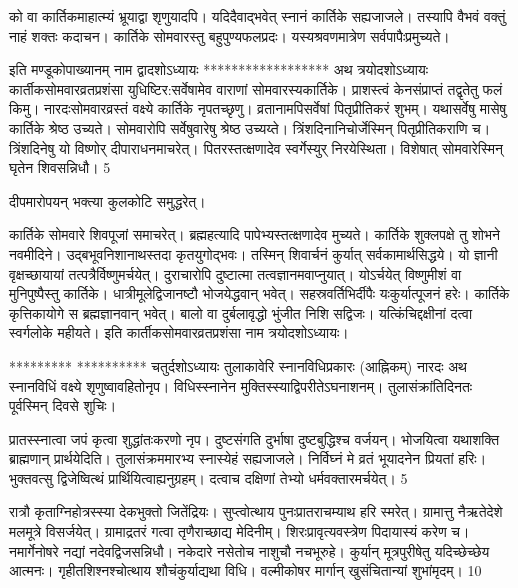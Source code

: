 को वा कार्तिकमाहात्म्यं भ्रूयाद्वा शृणुयादपि।
यदिदैवाद्भवेत् स्नानं कार्तिके सह्यजाजले।
तस्यापि वैभवं वक्तुं नाहं शक्तः कदाचन।
कार्तिके सोमवारस्तु बहुपुण्यफलप्रदः।
यस्यश्रवणमात्रेण सर्वपापैःप्रमुच्यते।

इति मण्डूकोपाख्यानम् नाम द्वादशोऽध्यायः
******************
अथ त्रयोदशोऽध्यायः
कार्तीकसोमवारव्रतप्रशंसा युधिष्टिर:सर्वेषामेव वाराणां सोमवारस्यकार्तिके।
प्राशस्त्वं केनसंप्राप्तं तद्वृतेतु फलं किमु।
नारदःसोमवारव्रस्तं वक्ष्ये कार्तिके नृपतच्छृणु।
व्रतानामपिसर्वेषां पितृप्रीतिकरं शुभम्।
यथासर्वेषु मासेषु कार्तिके श्रेष्ठ उच्यते।
सोमवारोपि सर्वेषुवारेषु श्रेष्ठ उच्यय्ते।
त्रिंशदिनानिचोर्जेस्मिन् पितृप्रीतिकराणि च।
त्रिंशदिनेषु यो विष्णोर् दीपाराधनमाचरेत्।
पितरस्तत्क्षणादेव स्वर्गेस्युर् निरयेस्थिता।
विशेषात् सोमवारेस्मिन् घृतेन शिवसन्निधौ।
5

दीपमारोपयन् भक्त्या कुलकोटि समुद्धरेत्।

कार्तिके सोमवारे शिवपूजां समाचरेत्।
ब्रह्महत्यादि पापेभ्यस्तत्क्षणादेव मुच्यते।
कार्तिके शुक्लपक्षे तु शोभने नवमीदिने।
उद्बभूवनिशानाथस्तदा कृतयुगोद्भवः।
तस्मिन् शिवार्चनं कुर्यात् सर्वकामार्थसिद्धये।
यो ज्ञानी वृक्षच्छायायां तत्पत्रैर्विष्णुमर्चयेत्।
दुराचारोपि दुष्टात्मा तत्वज्ञानमवाप्नुयात्।
योऽर्चयेत् विष्णुमीशं वा मुनिपुष्पैस्तु कार्तिके।
धात्रीमूलेद्विजानष्टौ भोजयेद्धवान् भवेत्।
सहस्रवर्तिभिर्दीपैः यःकुर्यात्पूजनं हरेः।
कार्तिके कृत्तिकायोगे स ब्रह्मज्ञानवान् भवेत्।
बालो वा दुर्बलावृद्धो भुंजीत निशि सद्विजः।
यत्किंचिद्दक्षीनां दत्वा स्वर्गलोके महीयते।
इति कार्तीकसोमवारव्रतप्रशंसा नाम
त्रयोदशोऽध्यायः।

*********
**********
चतुर्दशोऽध्यायः तुलाकावेरि स्नानविधिप्रकारः (आह्निकम्)
नारदः
अथ स्नानविधिं वक्ष्ये शृणुष्वावहितोनृप।
विधिस्स्नानेन मुक्तिस्स्याद्विपरीतेऽघनाशनम्।
तुलासंक्रांतिदिनतः पूर्वस्मिन् दिवसे शुचिः।

प्रातस्स्नात्वा जपं कृत्वा शुद्धांतःकरणो नृप।
दुष्टसंगति दुर्भाषा दुष्टबुद्धिश्च वर्जयन्।
भोजयित्वा यथाशक्ति ब्राह्मणान् प्रार्थयेदिति।
तुलासंक्रममारभ्य स्नास्येहं सह्यजाजले।
निर्विघ्नं मे व्रतं भूयादनेन प्रियतां हरिः।
भुक्तवत्सु द्विजेष्वित्थं प्रार्थियित्वाह्यनुग्रहम्।
दत्वाच दक्षिणां तेभ्यो धर्मवक्तारमर्चयेत्।
5

रात्रौ कृताग्निहोत्रस्स्या देकभुक्तो जितेंद्रियः।
सुप्त्वोत्थाय पुनःप्रातराचम्याथ हरि स्मरेत्।
ग्रामात्तु नैऋतेदेशे मलमूत्रे विसर्जयेत्।
ग्रामाद्रतरं गत्वा तृणैराच्छाद्य मेदिनीम्।
शिरःप्रावृत्यवस्त्रेण पिदायास्यं करेण च।
नमार्गेनोषरे नद्यां नदेवद्विजसन्निधौ।
नकेदारे नसेतोच नाशुचौ नचभूरुहे।
कुर्यान् मूत्रपुरीषेतु यदिच्छेच्छेय आत्मनः।
गृहीतशिश्नश्चोत्थाय शौचंकुर्याद्यथा विधि।
वल्मीकोषर मार्गान् खुसंचितान्यां शुभांमृदम्।
10

